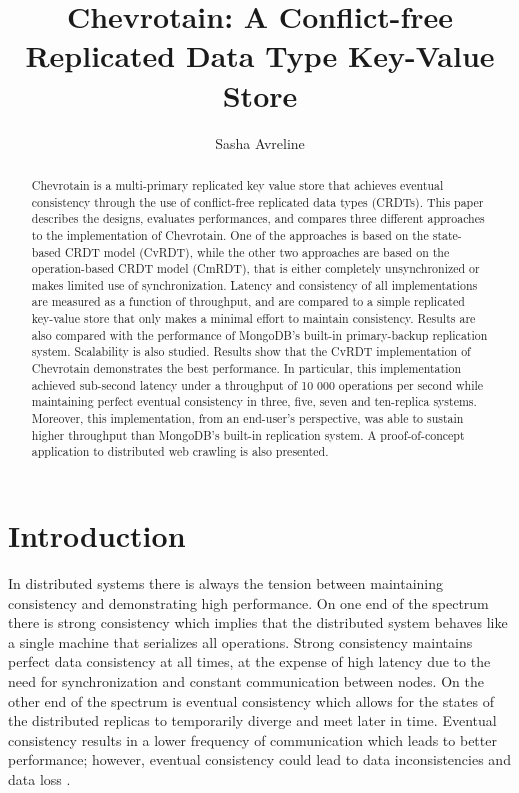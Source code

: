 \documentclass[sigconf,nonacm,10pt]{acmart}
\begin{document}
\title{Chevrotain: A Conflict-free Replicated Data Type Key-Value Store}

\author{Sasha Avreline}

\begin{abstract}
Chevrotain is a multi-primary replicated key value store that achieves eventual consistency through the use of conflict-free replicated data types (CRDTs). This paper describes the designs, evaluates performances, and compares three different approaches to the implementation of Chevrotain. One of the approaches is based on the state-based CRDT model (CvRDT), while the other two approaches are based on the operation-based CRDT model (CmRDT), that is either completely unsynchronized or makes limited use of synchronization. Latency and consistency of all implementations are measured as a function of throughput, and are compared to a simple replicated key-value store that only makes a minimal effort to maintain consistency. Results are also compared with the performance of MongoDB's built-in primary-backup replication system. Scalability is also studied. Results show that the CvRDT implementation of Chevrotain demonstrates the best performance. In particular, this implementation achieved sub-second latency under a throughput of 10 000 operations per second while maintaining perfect eventual consistency in three, five, seven and ten-replica systems. Moreover, this implementation, from an end-user's perspective, was able to sustain higher throughput than MongoDB's built-in replication system. A proof-of-concept application to distributed web crawling is also presented.
\end{abstract}


\maketitle

\section{Introduction} 

In distributed systems there is always the tension between maintaining consistency and demonstrating high performance. On one end of the spectrum there is strong consistency which implies that the distributed system behaves like a single machine that serializes all operations. Strong consistency maintains perfect data consistency at all times, at the expense of high latency due to the need for synchronization and constant communication between nodes. On the other end of the spectrum is eventual consistency which allows for the states of the distributed replicas to temporarily diverge and meet later in time. Eventual consistency results in a lower frequency of communication which leads to better performance; however, eventual consistency could lead to data inconsistencies and data loss \cite{li2012making}. 
\end{document}

